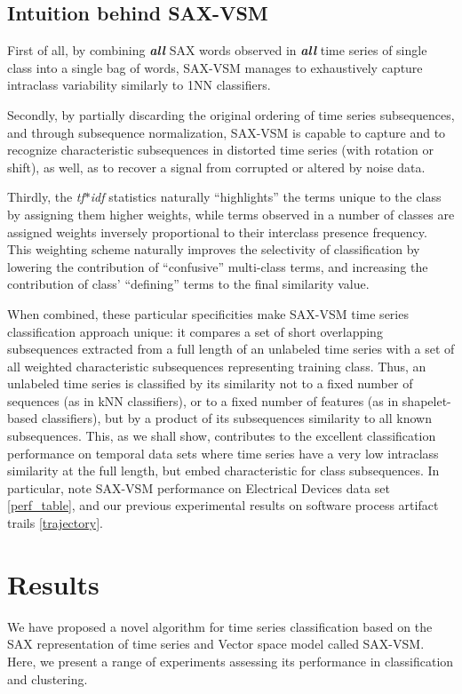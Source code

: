 \documentclass{llncs}
\begin{document}
\subsection{Intuition behind SAX-VSM}
First of all, by combining \textit{\textbf{all}} SAX words observed in \textit{\textbf{all}}
time series of single class into a single bag of words, SAX-VSM manages to exhaustively 
capture intraclass variability similarly to 1NN classifiers.  

Secondly, by partially discarding the original ordering of time series subsequences, and
through subsequence normalization, SAX-VSM is capable to capture and to recognize 
characteristic subsequences in distorted time series (with rotation or shift), as well,
as to recover a signal from corrupted or altered by noise data. 

Thirdly, the \textit{tf$\ast$idf} statistics naturally ``highlights'' the terms unique to the
class by assigning them higher weights, while terms observed in a number of classes are 
assigned weights inversely proportional to their interclass presence frequency. 
This weighting scheme naturally improves the selectivity of classification 
by  lowering the contribution of ``confusive'' multi-class terms, and  increasing  the 
contribution  of  class' ``defining'' terms to the final similarity value.   

When combined, these particular specificities make SAX-VSM time series classification 
approach unique: it compares a set of short overlapping subsequences extracted from a 
full length of an unlabeled time series with a set of all weighted characteristic subsequences
representing training class.
Thus, an unlabeled time series is classified by its similarity not to a fixed number 
of sequences (as in kNN classifiers), or to a fixed number of features (as in shapelet-based 
classifiers), but by a product of its subsequences similarity to all known subsequences.
This, as we shall show, contributes to the excellent classification performance on temporal 
data sets where time series have a very low intraclass similarity at the full length, but 
embed characteristic for class subsequences. In particular, note SAX-VSM performance 
on Electrical Devices data set \ref{perf_table}, and our previous experimental results on 
software process artifact trails \ref{trajectory}.
   
\section{Results}
We have proposed a novel algorithm for time series classification based on the SAX
representation of time series and Vector space model called SAX-VSM. Here, we present a range of
experiments assessing its performance in classification and clustering.
\end{document}
